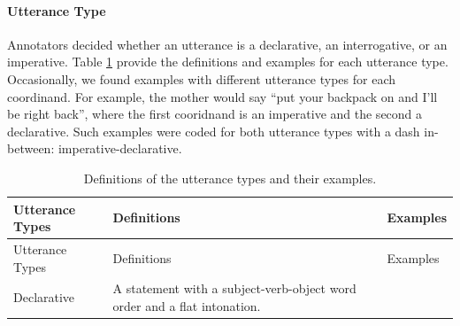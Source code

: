 \documentclass[floatsintext,man]{apa6}
\theoremstyle{definition}
\theoremstyle{definition}
\theoremstyle{definition}
\theoremstyle{remark}
\begin{document}
\paragraph{Utterance Type}\label{utterance-type}

Annotators decided whether an utterance is a declarative, an
interrogative, or an imperative. Table \ref{tab:utteranceTypes} provide
the definitions and examples for each utterance type. Occasionally, we
found examples with different utterance types for each coordinand. For
example, the mother would say \enquote{put your backpack on and I'll be
right back}, where the first cooridnand is an imperative and the second
a declarative. Such examples were coded for both utterance types with a
dash in-between: imperative-declarative.

\begin{longtable}[]{@{}lll@{}}
\caption{\label{tab:utteranceTypes} Definitions of the utterance types and
their examples.}\tabularnewline
\toprule
\begin{minipage}[b]{0.18\columnwidth}\raggedright\strut
Utterance Types\strut
\end{minipage} & \begin{minipage}[b]{0.42\columnwidth}\raggedright\strut
Definitions\strut
\end{minipage} & \begin{minipage}[b]{0.32\columnwidth}\raggedright\strut
Examples\strut
\end{minipage}\tabularnewline
\midrule
\endfirsthead
\toprule
\begin{minipage}[b]{0.18\columnwidth}\raggedright\strut
Utterance Types\strut
\end{minipage} & \begin{minipage}[b]{0.42\columnwidth}\raggedright\strut
Definitions\strut
\end{minipage} & \begin{minipage}[b]{0.32\columnwidth}\raggedright\strut
Examples\strut
\end{minipage}\tabularnewline
\midrule
\endhead
\begin{minipage}[t]{0.18\columnwidth}\raggedright\strut
Declarative\strut
\end{minipage} & \begin{minipage}[t]{0.42\columnwidth}\raggedright\strut
A statement with a subject-verb-object word order and a flat
intonation.\strut
\end{minipage} & \begin{minipage}[t]{0.32\columnwidth}\raggedright\strut

\end{minipage}
\end{longtable}
\end{document}
